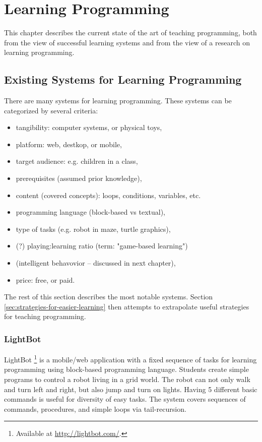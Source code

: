 \chapter{Learning Programming}
\label{chap:learning-programming}

This chapter describes the current state of the art of teaching programming, both from the view of successful learning systems and from the view of a research on learning programming.

\section{Existing Systems for Learning Programming}
\label{sec:existing-systems}

There are many systems for learning programming.
These systems can be categorized by several criteria:

\begin{itemize}
\item tangibility: computer systems, or physical toys,
\item platform: web, destkop, or mobile,
\item target audience: e.g. children in a class,
\item prerequisites (assumed prior knowledge),
\item content (covered concepts): loops, conditions, variables, etc.
\item programming language (block-based vs textual),
\item type of tasks (e.g. robot in maze, turtle graphics),
\item (?) playing:learning ratio (term: "game-based learning")
\item (intelligent behavovior -- discussed in next chapter),
\item price: free, or paid.
\end{itemize}

The rest of this section describes the most notable systems.
Section \ref{sec:strategies-for-easier-learning} then attempts to extrapolate useful strategies for teaching programming.


\subsection{LightBot}
\label{sec:lightbot}
LightBot%
\footnote{Available at \url{http://lightbot.com/}.}
is a mobile/web application with a fixed sequence of tasks for learning programming
using block-based programming language.
Students create simple programs to control a robot living in a grid world.
The robot can not only walk and turn left and right, but also jump and turn on lights.
Having 5 different basic commands is useful for diversity of easy tasks.
The system covers sequences of commands, procedures, and simple loops via tail-recursion.

